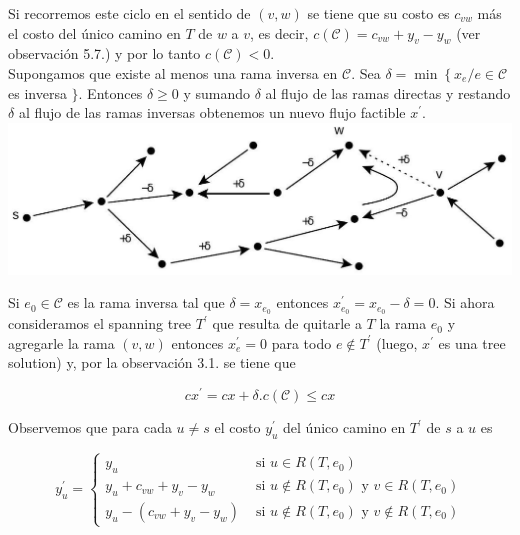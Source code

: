 \documentclass[10pt]{article}
\begin{document}
Si recorremos este ciclo en el sentido de $(v, w)$ se tiene que su costo es $c_{v w}$ más el costo del único camino en $T$ de $w$ a $v$, es decir, $c(\mathcal{C})=c_{v w}+y_{v}-y_{w}$ (ver observación 5.7.) y por lo tanto $c(\mathcal{C})<0$.\\
Supongamos que existe al menos una rama inversa en $\mathcal{C}$. Sea $\delta=\min \left\{x_{e} / e \in \mathcal{C}\right.$ es inversa $\}$. Entonces $\delta \geq 0$ y sumando $\delta$ al flujo de las ramas directas y restando $\delta$ al flujo de las ramas inversas obtenemos un nuevo flujo factible $x^{\prime}$.\\
\includegraphics[max width=\textwidth, center]{2025_09_05_955b52bfc43174a24a9ag-24}

Si $e_{0} \in \mathcal{C}$ es la rama inversa tal que $\delta=x_{e_{0}}$ entonces $x_{e_{0}}^{\prime}=x_{e_{0}}-\delta=0$. Si ahora consideramos el spanning tree $T^{\prime}$ que resulta de quitarle a $T$ la rama $e_{0}$ y agregarle la rama $(v, w)$ entonces $x_{e}^{\prime}=0$ para todo $e \notin T^{\prime}$ (luego, $x^{\prime}$ es una tree solution) y, por la observación 3.1. se tiene que

$$
c x^{\prime}=c x+\delta . c(\mathcal{C}) \leq c x
$$

Observemos que para cada $u \neq s$ el costo $y_{u}^{\prime}$ del único camino en $T^{\prime}$ de $s$ a $u$ es

$$
y_{u}^{\prime}= \begin{cases}y_{u} & \text { si } u \in R\left(T, e_{0}\right) \\ y_{u}+c_{v w}+y_{v}-y_{w} & \text { si } u \notin R\left(T, e_{0}\right) \text { y } v \in R\left(T, e_{0}\right) \\ y_{u}-\left(c_{v w}+y_{v}-y_{w}\right) & \text { si } u \notin R\left(T, e_{0}\right) \text { y } v \notin R\left(T, e_{0}\right)\end{cases}
$$
\end{document}
